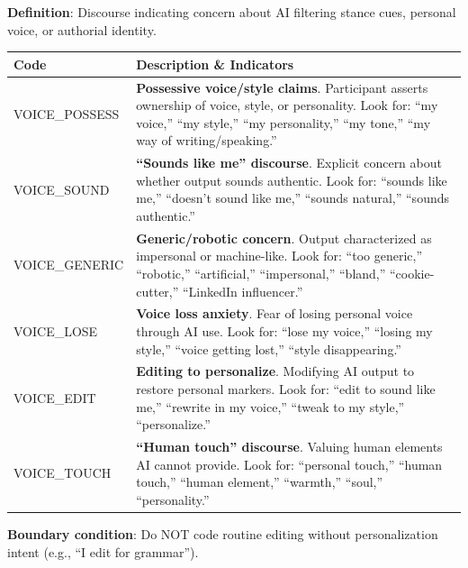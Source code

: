 \documentclass[11pt]{article}
\begin{document}
\begin{tcolorbox}[colback=voicecolor!10, colframe=voicecolor!80, title=\textbf{VOICE: Voice and Authenticity Concern Codes}, fonttitle=\bfseries\sffamily]

\textbf{Definition}: Discourse indicating concern about AI filtering stance cues, personal voice, or authorial identity.

\vspace{0.5em}
\begin{tabular}{@{}p{3.5cm}p{10cm}@{}}
\toprule
\textbf{Code} & \textbf{Description \& Indicators} \\
\midrule
VOICE\_POSSESS & \textbf{Possessive voice/style claims}. Participant asserts ownership of voice, style, or personality. Look for: ``my voice,'' ``my style,'' ``my personality,'' ``my tone,'' ``my way of writing/speaking.'' \\[0.5em]
VOICE\_SOUND & \textbf{``Sounds like me'' discourse}. Explicit concern about whether output sounds authentic. Look for: ``sounds like me,'' ``doesn't sound like me,'' ``sounds natural,'' ``sounds authentic.'' \\[0.5em]
VOICE\_GENERIC & \textbf{Generic/robotic concern}. Output characterized as impersonal or machine-like. Look for: ``too generic,'' ``robotic,'' ``artificial,'' ``impersonal,'' ``bland,'' ``cookie-cutter,'' ``LinkedIn influencer.'' \\[0.5em]
VOICE\_LOSE & \textbf{Voice loss anxiety}. Fear of losing personal voice through AI use. Look for: ``lose my voice,'' ``losing my style,'' ``voice getting lost,'' ``style disappearing.'' \\[0.5em]
VOICE\_EDIT & \textbf{Editing to personalize}. Modifying AI output to restore personal markers. Look for: ``edit to sound like me,'' ``rewrite in my voice,'' ``tweak to my style,'' ``personalize.'' \\[0.5em]
VOICE\_TOUCH & \textbf{``Human touch'' discourse}. Valuing human elements AI cannot provide. Look for: ``personal touch,'' ``human touch,'' ``human element,'' ``warmth,'' ``soul,'' ``personality.'' \\
\bottomrule
\end{tabular}

\vspace{0.5em}
\textbf{Boundary condition}: Do NOT code routine editing without personalization intent (e.g., ``I edit for grammar'').
\end{tcolorbox}

\newpage
\end{document}
